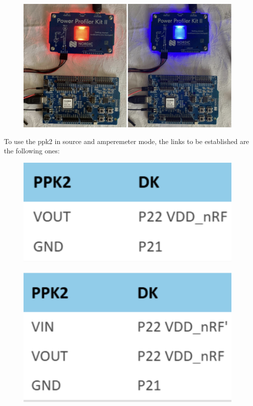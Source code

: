 \documentclass{Configuration_Files/PoliMi3i_thesis}
\begin{document}
\begin{figure}[H]
    \centering
    \includegraphics[scale=0.3]{Test_Procedure/8.png}
    \label{fig:direct_communication_board_PC}
\end{figure}

To use the ppk2 in source and amperemeter mode, the links to be established are the following ones:

\begin{figure}[H]
    \centering
    \includegraphics[scale=0.3]{Test_Procedure/9.png}
    \label{fig:direct_communication_board_PC}
\end{figure}

\begin{figure}[H]
    \centering
    \includegraphics[scale=0.3]{Test_Procedure/10.png}
    \label{fig:direct_communication_board_PC}
\end{figure}
\end{document}
